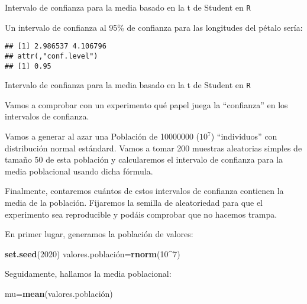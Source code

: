 \documentclass[ignorenonframetext,]{beamer}
\newenvironment{Shaded}{\begin{snugshade}}{\end{snugshade}}
\newcommand{\DataTypeTok}[1]{\textcolor[rgb]{0.13,0.29,0.53}{#1}}
\newcommand{\DecValTok}[1]{\textcolor[rgb]{0.00,0.00,0.81}{#1}}
\newcommand{\FloatTok}[1]{\textcolor[rgb]{0.00,0.00,0.81}{#1}}
\newcommand{\KeywordTok}[1]{\textcolor[rgb]{0.13,0.29,0.53}{\textbf{#1}}}
\newcommand{\NormalTok}[1]{#1}
\newcommand{\OperatorTok}[1]{\textcolor[rgb]{0.81,0.36,0.00}{\textbf{#1}}}
\begin{document}
\begin{frame}[fragile]{Intervalo de confianza para la media basado en la
t de Student en \texttt{R}}
\protect\hypertarget{intervalo-de-confianza-para-la-media-basado-en-la-t-de-student-en-r-2}{}

Un intervalo de confianza al 95\% de confianza para las longitudes del
pétalo sería:

\begin{Shaded}
\end{Shaded}

\begin{verbatim}
## [1] 2.986537 4.106796
## attr(,"conf.level")
## [1] 0.95
\end{verbatim}

\end{frame}

\begin{frame}[fragile]{Intervalo de confianza para la media basado en la
t de Student en \texttt{R}}
\protect\hypertarget{intervalo-de-confianza-para-la-media-basado-en-la-t-de-student-en-r-3}{}

Vamos a comprobar con un experimento qué papel juega la ``confianza'' en
los intervalos de confianza.

Vamos a generar al azar una Población de 10000000 (\(10^7\))
``individuos'' con distribución normal estándard. Vamos a tomar 200
muestras aleatorias simples de tamaño 50 de esta población y
calcularemos el intervalo de confianza para la media poblacional usando
dicha fórmula.

Finalmente, contaremos cuántos de estos intervalos de confianza
contienen la media de la población. Fijaremos la semilla de aleatoriedad
para que el experimento sea reproducible y podáis comprobar que no
hacemos trampa.

En primer lugar, generamos la población de valores:

\begin{Shaded}
\begin{Highlighting}[]
\KeywordTok{set.seed}\NormalTok{(}\DecValTok{2020}\NormalTok{)}
\NormalTok{valores.población=}\KeywordTok{rnorm}\NormalTok{(}\DecValTok{10}\OperatorTok{^}\DecValTok{7}\NormalTok{)}
\end{Highlighting}
\end{Shaded}

Seguidamente, hallamos la media poblacional:

\begin{Shaded}
\begin{Highlighting}[]
\NormalTok{mu=}\KeywordTok{mean}\NormalTok{(valores.población)}
\end{Highlighting}
\end{Shaded}

\end{frame}
\end{document}
